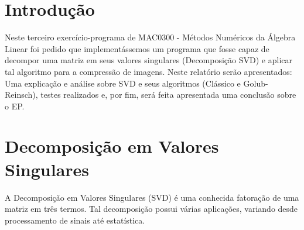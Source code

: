 \documentclass[brazil,times]{abnt}
\begin{document}





\data{\today}

\capa

\folhaderosto

\tableofcontents

\chapter{Introdução\label{cap:introducao}}
	Neste terceiro exercício-programa de MAC0300 - Métodos Numéricos da Álgebra Linear foi pedido que implementássemos um programa que fosse capaz de decompor uma matriz em seus valores singulares (Decomposição SVD) e aplicar tal algoritmo para a compressão de imagens. Neste relatório serão apresentados: Uma explicação e análise sobre SVD e seus algoritmos (Clássico e Golub-Reinsch), testes realizados e, por fim, será feita apresentada uma conclusão sobre o EP.







\chapter{Decomposição em Valores Singulares}
	A Decomposição em Valores Singulares (SVD) é uma conhecida fatoração de uma matriz em três termos. Tal decomposição possui várias aplicações, variando desde processamento de sinais até estatística.
	
\end{document}
